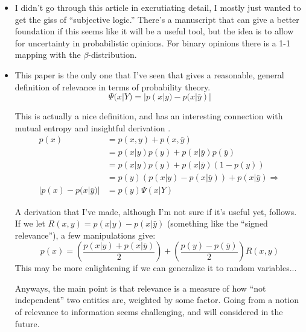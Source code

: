 \documentclass{article}
\begin{document}

\begin{itemize}

    \item I didn't go through this article in excrutiating detail, I mostly just wanted to get the giss of ``subjective logic.''  There's a manuscript that can give a better foundation if this seems like it will be a useful tool, but the idea is to allow for uncertainty in probabilistic opinions.  For binary opinions there is a 1-1 mapping with the $\beta$-distribution.

    \item {}  This paper is the only one that I've seen that gives a reasonable, general definition of relevance in terms of probability theory.
    \[ \Psi(x|Y) = |p(x|y) - p(x|\bar y)| \]

    This is actually a nice definition, and has an interesting connection with mutual entropy and insightful derivation .
    \begin{align*}
    p(x) & = p(x,y) + p(x,\bar y) \\
         & = p(x|y)p(y) + p(x|\bar y)p(\bar y) \\
         & = p(x|y)p(y) + p(x|\bar y)(1-p(y)) \\
         & = p(y)(p(x|y) - p(x|\bar y)) + p(x|\bar y) \Rightarrow \\
    |p(x) - p(x|\bar y)| & = p(y)\Psi(x|Y)
    \end{align*}

    A derivation that I've made, although I'm not sure if it's useful yet, follows.  If we let $R(x,y) = p(x|y)-p(x|\bar y)$ (something like the ``signed relevance''), a few manipulations give:
    \[ p(x) = \left(\frac{p(x|y) + p(x|\bar y)}{2}\right) + \left(\frac{p(y)-p(\bar y)}{2}\right)R(x,y) \]
    This may be more enlightening if we can generalize it to random variables...

    Anyways, the main point is that relevance is a measure of how ``not independent'' two entities are, weighted by some factor.  Going from a notion of relevance to information seems challenging, and will considered in the future.


\end{itemize}

\end{document}
